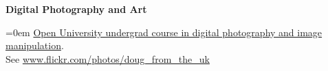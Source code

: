 \documentclass[paper=a4,fontsize=11pt]{scrartcl}	 			%
\newcommand{\NewPart}[1]{\vspace*{-0.5em} \section*{\uppercase{#1}} \vspace*{-0.75em} }
\newcommand{\BibEntry}[2]{
		\vspace*{-1em} \noindent \textbf{#1} \hfill \par					%
		\hangindent=0em\hangafter=0 \small #2} 	%
\begin{document}
\BibEntry{Digital Photography and Art}{\href{http://www3.open.ac.uk/study/undergraduate/course/t189.htm}{Open University undergrad course in digital photography and image manipulation}. \\ See \href{http://www.flickr.com/photos/doug\_from\_the\_uk/}{www.flickr.com/photos/doug\_from\_the\_uk}}




%
%
\end{document}

